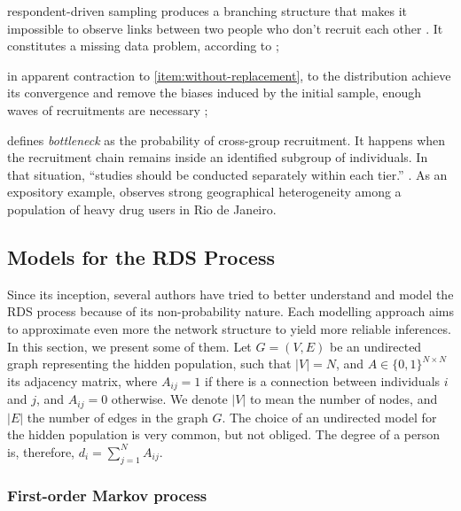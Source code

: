 \begin{alineas}
  \item respondent-driven sampling produces a branching structure that makes
  it impossible to observe links between two people who don't recruit each
  other \cite[p. 17]{gile2015network}. It constitutes a missing data problem, according to \textcite[p.
  190]{crawford2016};

  \item in apparent contraction to \autoref{item:without-replacement}, to
  the distribution achieve its convergence and remove the biases induced by
  the initial sample, enough waves of recruitments are necessary \cite[p. 186]{heckathorn1997};
  
  \item \textcite[p. 2225]{goel2009respondent} defines {\em bottleneck}
  as the probability of cross-group recruitment. It happens when the
  recruitment chain remains inside an identified subgroup of individuals. In that
  situation, ``studies should be conducted separately within each tier.''
  \cite[p. 75]{gile2018methods}. As an expository example,
  \textcite[p. S139]{toledo2011putting} observes strong geographical
  heterogeneity among a population of heavy drug users in Rio de Janeiro. 
\end{alineas}

\subsection{Models for the RDS Process}
\label{sec:models-rds-process}

Since its inception, several authors have tried to better understand and model
the RDS process because of its non-probability nature. Each modelling approach
aims to approximate even more the network structure to yield more reliable
inferences. In this section, we present some of them. Let $G = (V,E)$ be an
undirected graph representing the hidden population, such that $|V| = N$, and
$A \in \{0,1\}^{N \times N}$ its adjacency matrix, where $A_{ij} = 1$ if there
is a connection between individuals $i$ and $j$, and $A_{ij} = 0$ otherwise.
We denote $|V|$ to mean the number of nodes, and $|E|$ the number of edges in
the graph $G$. The choice of an undirected model for the hidden population is very common,
but not obliged. The degree of a person is, therefore, $d_i = \sum_{j=1}^N
A_{ij}$. 

\subsubsection{First-order Markov process}

